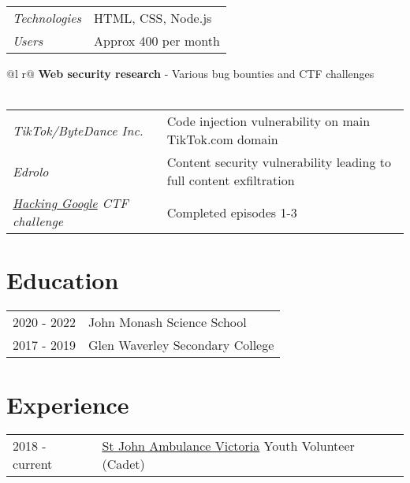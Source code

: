 \documentclass[a4paper,11pt]{article}
\begin{document}
\begin{tabularx}{\linewidth}{l X}
    \textit{Technologies} & \hfill HTML, CSS, Node.js \\
    \textit{Users} & \hfill Approx 400 per month \\
\end{tabularx}

\begin{tabularx}{\linewidth}{ @{}l r@{} }
\textbf{Web security research} - Various bug bounties and CTF challenges \\[3.75pt]
  \\
\end{tabularx}

\begin{tabularx}{\linewidth}{l X}
    \textit{TikTok/ByteDance Inc.} & \hfill Code injection vulnerability on main TikTok.com domain \\
    \textit{Edrolo} & \hfill Content security vulnerability leading to full content exfiltration \\
    \textit{\href{https://h4ck1ng.google/}{Hacking Google} CTF challenge} & \hfill Completed episodes 1-3 \\
\end{tabularx}

\section{Education}
\begin{tabularx}{\linewidth}{@{}l X@{}}	

2020 - 2022 & John Monash Science School \hfill \normalsize \\
2017 - 2019 & Glen Waverley Secondary College \hfill \\ 

\end{tabularx}

\section{Experience}
\begin{tabularx}{\linewidth}{@{}l X@{}}

    2018 - current & \href{https://www.stjohnvic.com.au/}{St John Ambulance Victoria} \hfill Youth Volunteer (Cadet) \\

\end{tabularx}
\end{document}

